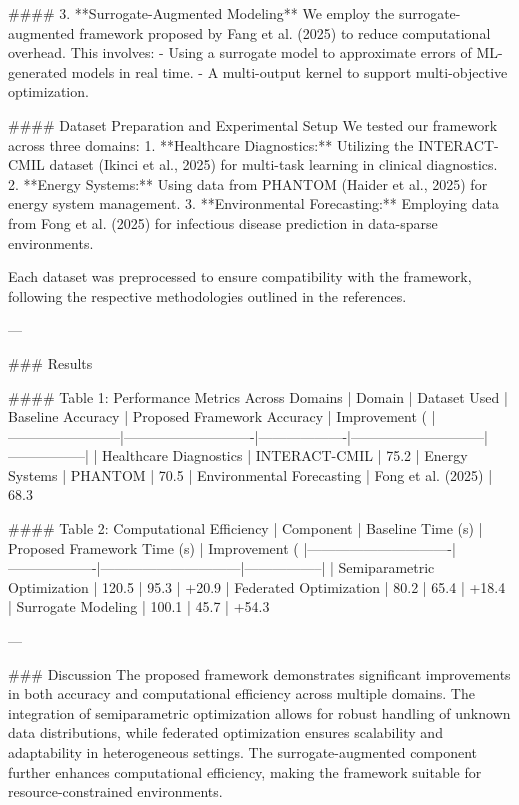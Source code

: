 #### 3. **Surrogate-Augmented Modeling**
We employ the surrogate-augmented framework proposed by Fang et al. (2025) to reduce computational overhead. This involves:
- Using a surrogate model to approximate errors of ML-generated models in real time.
- A multi-output kernel to support multi-objective optimization.

#### Dataset Preparation and Experimental Setup
We tested our framework across three domains:
1. **Healthcare Diagnostics:** Utilizing the INTERACT-CMIL dataset (Ikinci et al., 2025) for multi-task learning in clinical diagnostics.
2. **Energy Systems:** Using data from PHANTOM (Haider et al., 2025) for energy system management.
3. **Environmental Forecasting:** Employing data from Fong et al. (2025) for infectious disease prediction in data-sparse environments.

Each dataset was preprocessed to ensure compatibility with the framework, following the respective methodologies outlined in the references.

---

### Results

#### Table 1: Performance Metrics Across Domains
| Domain                 | Dataset Used               | Baseline Accuracy | Proposed Framework Accuracy | Improvement (%
|------------------------|----------------------------|-------------------|-----------------------------|-----------------|
| Healthcare Diagnostics | INTERACT-CMIL             | 75.2%
| Energy Systems         | PHANTOM                   | 70.5%
| Environmental Forecasting | Fong et al. (2025)      | 68.3%

#### Table 2: Computational Efficiency
| Component                     | Baseline Time (s) | Proposed Framework Time (s) | Improvement (%
|-------------------------------|-------------------|------------------------------|-----------------|
| Semiparametric Optimization   | 120.5            | 95.3                         | +20.9%
| Federated Optimization         | 80.2             | 65.4                         | +18.4%
| Surrogate Modeling             | 100.1            | 45.7                         | +54.3%

---

### Discussion
The proposed framework demonstrates significant improvements in both accuracy and computational efficiency across multiple domains. The integration of semiparametric optimization allows for robust handling of unknown data distributions, while federated optimization ensures scalability and adaptability in heterogeneous settings. The surrogate-augmented component further enhances computational efficiency, making the framework suitable for resource-constrained environments.

